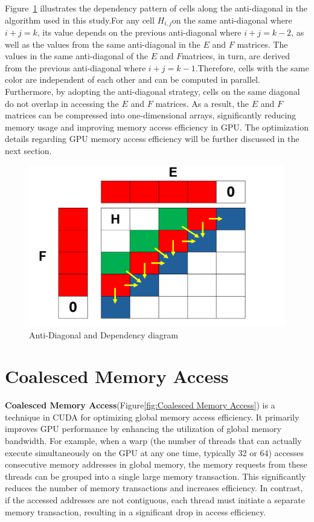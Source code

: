 \documentclass[PhD]{PHlab-thesis}
\begin{document}
Figure~\ref{fig:Anti-Diagonal and Dependency diagram} illustrates the dependency pattern of cells along the anti-diagonal in the algorithm used in this study.For any cell $H_{i,j}$on the same anti-diagonal where $i+j=k$, its value depends on the previous anti-diagonal where $i + j = k - 2$, as well as the values from the same anti-diagonal in the $E$ and $F$ matrices. The values in the same anti-diagonal of the $E$ and $F$matrices, in turn, are derived from the previous anti-diagonal where $i + j = k - 1$.Therefore, cells with the same color are independent of each other and can be computed in parallel. Furthermore, by adopting the anti-diagonal strategy, cells on the same diagonal do not overlap in accessing the $E$ and $F$ matrices. As a result, the $E$ and $F$ matrices can be compressed into one-dimensional arrays, significantly reducing memory usage and improving memory access efficiency in GPU. The optimization details regarding GPU memory access efficiency will be further discussed in the next section.
\vspace{0.5cm}
\begin{figure}[ht]
    \centering
    \includegraphics[width = 1\textwidth]{figures/Anti-Diagonal.png}
    \caption{Anti-Diagonal and Dependency diagram}
    \label{fig:Anti-Diagonal and Dependency diagram}
\end{figure}

\section{Coalesced Memory Access}
\textbf{Coalesced Memory Access}(Figure\ref{fig:Coalesced Memory Access}) is a technique in CUDA for optimizing global memory access efficiency. It primarily improves GPU performance by enhancing the utilization of global memory bandwidth. For example, when a warp (the number of threads that can actually execute simultaneously on the GPU at any one time, typically 32 or 64) accesses consecutive memory addresses in global memory, the memory requests from these threads can be grouped into a single large memory transaction. This significantly reduces the number of memory transactions and increases efficiency. In contrast, if the accessed addresses are not contiguous, each thread must initiate a separate memory transaction, resulting in a significant drop in access efficiency.
\end{document}
